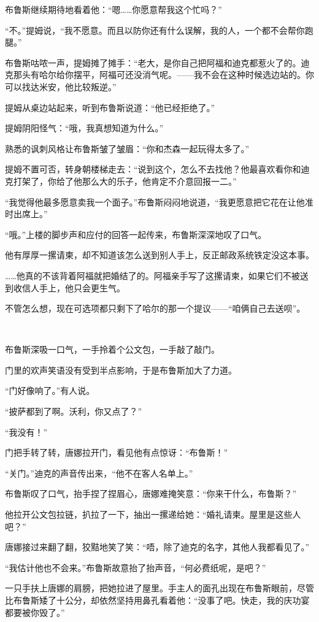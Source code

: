 \documentclass[../main]{subfiles}
\begin{document}
布鲁斯继续期待地看着他：“嗯……你愿意帮我这个忙吗？”

“不。”提姆说，“我不愿意。而且以防你还有什么误解，我的人，一个都不会帮你跑腿。”

布鲁斯咕哝一声，提姆摊了摊手：“老大，是你自己把阿福和迪克都惹火了的。迪克那头有哈尔给你摆平，阿福可还没消气呢。——我不会在这种时候选边站的。你可以找达米安，他比较叛逆。”

提姆从桌边站起来，听到布鲁斯说道：“他已经拒绝了。”

提姆阴阳怪气：“哦，我真想知道为什么。”

熟悉的讽刺风格让布鲁斯皱了皱眉：“你和杰森一起玩得太多了。”

提姆不置可否，转身朝楼梯走去：“说到这个，怎么不去找他？他最喜欢看你和迪克打架了，你给了他那么大的乐子，他肯定不介意回报一二。”

“我觉得他最多愿意卖我一个面子。”布鲁斯闷闷地说道，“我更愿意把它花在让他准时出席上。”

“哦。”上楼的脚步声和应付的回答一起传来，布鲁斯深深地叹了口气。

他有厚厚一摞请柬，却不知道该怎么送到别人手上，反正邮政系统铁定没这本事。

……他真的不该背着阿福就把婚结了的。阿福亲手写了这摞请柬，如果它们不被送到收信人手上，他只会更生气。

不管怎么想，现在可选项都只剩下了哈尔的那一个提议——“咱俩自己去送呗”。

~\

布鲁斯深吸一口气，一手拎着个公文包，一手敲了敲门。

门里的欢声笑语没有受到半点影响，于是布鲁斯加大了力道。

“门好像响了。”有人说。

“披萨都到了啊。沃利，你又点了？”

“我没有！”

门把手转了转，唐娜拉开门，看见他有点惊讶：“布鲁斯！”

“关门。”迪克的声音传出来，“他不在客人名单上。”

布鲁斯叹了口气，抬手捏了捏眉心，唐娜难掩笑意：“你来干什么，布鲁斯？”

他拉开公文包拉链，扒拉了一下，抽出一摞递给她：“婚礼请柬。屋里是这些人吧？”

唐娜接过来翻了翻，狡黠地笑了笑：“唔，除了迪克的名字，其他人我都看见了。”

“我估计他也不会来。”布鲁斯故意抬了抬声音，“何必费纸呢，是吧？”

一只手扶上唐娜的肩膀，把她拉进了屋里。手主人的面孔出现在布鲁斯眼前，尽管比布鲁斯矮了十公分，却依然坚持用鼻孔看着他：“没事了吧。快走，我的庆功宴都要被你毁了。”
\end{document}
